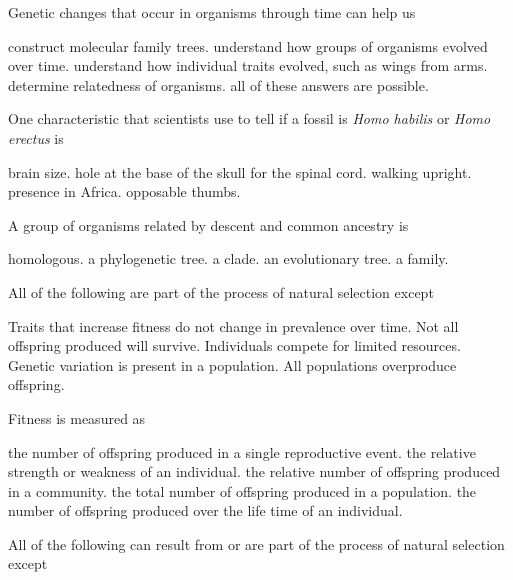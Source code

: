 \newpage

\question
Genetic changes that occur in organisms through time can help us

\begin{choices}
\choice construct molecular family trees.
\choice understand how groups of organisms evolved over time.
\choice understand how individual traits evolved, such as wings from arms.
\choice determine relatedness of organisms.
\correctchoice all of these answers are possible.%
\end{choices}

\question
One characteristic that scientists use to tell if a fossil is \textit{Homo habilis} or \textit{Homo erectus} is

\begin{choices}
\correctchoice brain size.
\choice hole at the base of the skull for the spinal cord.
\choice walking upright.
\choice presence in Africa.
\choice opposable thumbs.
\end{choices}

\question
A group of organisms related by descent and common ancestry is

\begin{choices}
\choice homologous.
\choice a phylogenetic tree.
\correctchoice a clade.
\choice an evolutionary tree.
\choice a family.
\end{choices}

\question
All of the following are part of the process of natural selection except

\begin{choices}
\correctchoice Traits that increase fitness do not change in prevalence over time.
\choice Not all offspring produced will survive.
\choice Individuals compete for limited resources.
\choice Genetic variation is present in a population.
\choice All populations overproduce offspring.
\end{choices}

\question
Fitness is measured as

\begin{choices}
\choice the number of offspring produced in a single reproductive event.
\choice the relative strength or weakness of an individual.
\choice the relative number of offspring produced in a community.
\choice the total number of offspring produced in a population.
\correctchoice the number of offspring produced over the life time of an individual.
\end{choices}

\question
All of the following can result from or are part of the process of natural selection except

